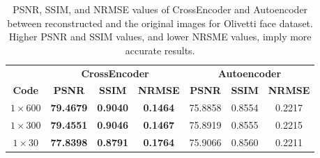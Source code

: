 \documentclass{jcmlatex}
\begin{document}
\begin{table}[ht]
\caption{PSNR, SSIM, and NRMSE values of CrossEncoder and Autoencoder between reconstructed and the original images for Olivetti face dataset.  Higher PSNR and SSIM values, and lower NRSME values, imply more accurate results.}
\begin{center}
\noindent\begin{tabular}{|c|c|c|c|c|c|c|}
\toprule
& \multicolumn{3}{c|}{\textbf{CrossEncoder}} & \multicolumn{3}{c|}{\textbf{Autoencoder}} \\
\cmidrule(r){2-4}\cmidrule(l){5-7}
\textbf{Code} & \textbf{PSNR} & \textbf{SSIM} & \textbf{NRMSE}  & \textbf{PSNR} & \textbf{SSIM} & \textbf{NRMSE} \\
\midrule
$1\times600$  & \textbf{79.4679} & \textbf{0.9040} &  \textbf{0.1464} & 75.8858 & 0.8554 &  0.2217\\ [0.5ex]
$1\times300$  & \textbf{79.4551} & \textbf{0.9046} &  \textbf{0.1467} & 75.8919 & 0.8555 &  0.2215\\ [0.5ex]
$1\times30$  & \textbf{77.8398} & \textbf{0.8791} & \textbf{0.1764} & 75.9066 & 0.8560 &  0.2211\\ [0.5ex]
\bottomrule
\end{tabular}
\end{center}
\label{table8}
\vspace{-1em}

\end{table}
\end{document}
